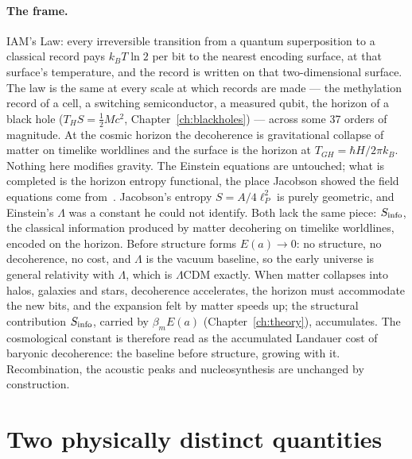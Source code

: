 \paragraph{The frame.} IAM's Law: every irreversible transition from a quantum superposition to a classical record pays $k_BT\ln2$ per
bit to the nearest encoding surface, at that surface's temperature, and the record is written on that two-dimensional surface. The
law is the same at every scale at which records are made --- the methylation record of a cell, a switching semiconductor, a measured
qubit, the horizon of a black hole ($T_HS=\tfrac12Mc^2$, Chapter~\ref{ch:blackholes}) --- across some 37 orders of magnitude. At the
cosmic horizon the decoherence is gravitational collapse of matter on timelike worldlines and the surface is the horizon at
$T_{GH}=\hbar H/2\pi k_B$. Nothing here modifies gravity. The Einstein equations are untouched; what is completed is the horizon
entropy functional, the place Jacobson showed the field equations come from~\cite{Jacobson1995}. Jacobson's entropy $S=A/4\ell_P^2$
is purely geometric, and Einstein's $\Lambda$ was a constant he could not identify. Both lack the same piece: $S_{\rm info}$, the
classical information produced by matter decohering on timelike worldlines, encoded on the horizon. Before structure forms
$E(a)\to0$: no structure, no decoherence, no cost, and $\Lambda$ is the vacuum baseline, so the early universe is general relativity
with $\Lambda$, which is $\Lambda$CDM exactly. When matter collapses into halos, galaxies and stars, decoherence accelerates, the
horizon must accommodate the new bits, and the expansion felt by matter speeds up; the structural contribution $S_{\rm info}$,
carried by $\beta_mE(a)$ (Chapter~\ref{ch:theory}), accumulates. The cosmological constant is therefore read as the accumulated
Landauer cost of baryonic decoherence: the baseline before structure, growing with it. Recombination, the acoustic peaks and
nucleosynthesis are unchanged by construction. \conjecture

\section{Two physically distinct quantities}\label{sec:lam_two}
